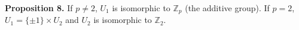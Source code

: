 \textbf{Proposition 8.} If $p \neq 2$, $U_1$ is isomorphic to $\mathbb{Z}_p$ (the additive group). If $p = 2$, $U_1 = \{\pm 1\} \times U_2$ and $U_2$ is isomorphic to $\mathbb{Z}_2$.
